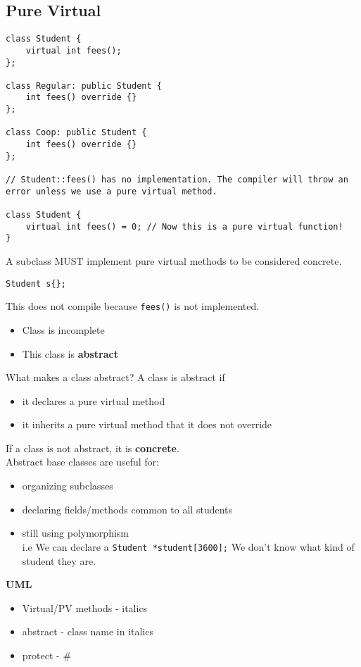 \documentclass[12pt]{article}
\begin{document}
\subsection{Pure Virtual}
\begin{lstlisting}
class Student {
    virtual int fees();
};

class Regular: public Student {
    int fees() override {}
};

class Coop: public Student {
    int fees() override {}
};

// Student::fees() has no implementation. The compiler will throw an error unless we use a pure virtual method. 

class Student {
    virtual int fees() = 0; // Now this is a pure virtual function!
}
\end{lstlisting}
A subclass MUST implement pure virtual methods to be considered concrete.
\begin{lstlisting}
Student s{};
\end{lstlisting}
This does not compile because \lstinline{fees()} is not implemented.
\begin{itemize}
    \item Class is incomplete
    \item This class is \textbf{abstract}
\end{itemize}
What makes a class abstract? A class is abstract if
\begin{itemize}
    \item it declares a pure virtual method
    \item it inherits a pure virtual method that it does not override
\end{itemize}
If a class is not abstract, it is \textbf{concrete}.
\\ Abstract base classes are useful for:
\begin{itemize}
    \item organizing subclasses
    \item declaring fields/methods common to all students
    \item still using polymorphism \\
    i.e We can declare a \lstinline{Student *student[3600];} We don't know what kind of student they are.
\end{itemize}
\textbf{UML}
\begin{itemize}
    \item Virtual/PV methods - italics
    \item abstract           - class name in italics
    \item protect            - \#
\end{itemize}
\end{document}
